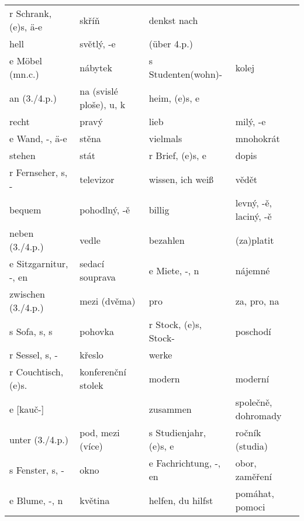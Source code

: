 \begin{table}[ht!]
\begin{tabular}{llll}
          r Schrank, (e)s, ä-e    & skříň         & denkst nach       &                           \\
          hell                    & světlý, -e    &  (über 4.p.)      &                           \\
          e Möbel (mn.c.)         & nábytek       & s Studenten(wohn)-& kolej                     \\
          an (3./4.p.)            & na (svislé ploše), u, k   & heim, (e)s, e  &                  \\
          recht                   & pravý         & lieb              & milý, -e                  \\
          e Wand, -, ä-e          & stěna         & vielmals          & mnohokrát                 \\
          stehen                  & stát          &  r Brief, (e)s, e & dopis                     \\
          r Fernseher, s, -       & televizor     & wissen, ich weiß  & vědět                     \\
          bequem                  & pohodlný, -ě  & billig            & levný, -ě, laciný, -ě     \\
          neben (3./4.p.)         & vedle         & bezahlen          & (za)platit                \\
          e Sitzgarnitur, -, en   & sedací souprava  & e Miete, -, n  & nájemné                   \\
          zwischen (3./4.p.)      & mezi (dvěma)  & pro               &  za, pro, na              \\
          s Sofa, s, s            & pohovka       & r Stock, (e)s, Stock-  & poschodí             \\
          r Sessel, s, -          & křeslo        & werke             &                           \\
          r Couchtisch,(e)s.      & konferenční stolek  & modern      & moderní                   \\
          e [kauč-]               &               & zusammen          & společně, dohromady       \\
          unter (3./4.p.)         & pod, mezi (více) & s Studienjahr, (e)s, e  & ročník (studia)  \\
          s Fenster, s, -         & okno          & e Fachrichtung, -, en      & obor, zaměření   \\
          e Blume, -, n           & květina       & helfen, du hilfst & pomáhat, pomoci           \\

\end{tabular}
\end{table}
